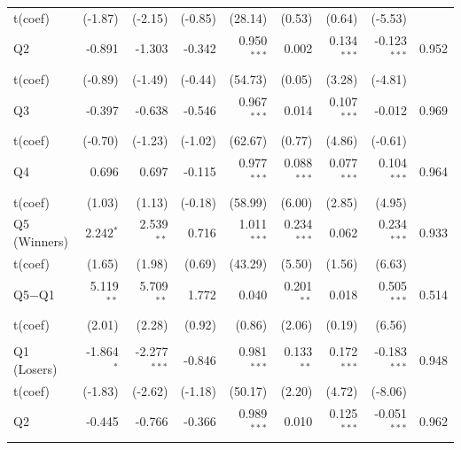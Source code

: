 {\begin{longtable}[t]{lrrrrrrrr}
\hspace{1em}t(coef) & (-1.87) & (-2.15) & (-0.85) & (28.14) & (0.53) & (0.64) & (-5.53) & \\
\hspace{1em}Q2 & -0.891 & -1.303 & -0.342 & 0.950$^{***}$ & 0.002 & 0.134$^{***}$ & -0.123$^{***}$ & 0.952\\
\hspace{1em}t(coef) & (-0.89) & (-1.49) & (-0.44) & (54.73) & (0.05) & (3.28) & (-4.81) & \\
\hspace{1em}Q3 & -0.397 & -0.638 & -0.546 & 0.967$^{***}$ & 0.014 & 0.107$^{***}$ & -0.012 & 0.969\\
\hspace{1em}t(coef) & (-0.70) & (-1.23) & (-1.02) & (62.67) & (0.77) & (4.86) & (-0.61) & \\
\hspace{1em}Q4 & 0.696 & 0.697 & -0.115 & 0.977$^{***}$ & 0.088$^{***}$ & 0.077$^{***}$ & 0.104$^{***}$ & 0.964\\
\hspace{1em}t(coef) & (1.03) & (1.13) & (-0.18) & (58.99) & (6.00) & (2.85) & (4.95) & \\
\hspace{1em}Q5 (Winners) & 2.242$^{*}$ & 2.539$^{**}$ & 0.716 & 1.011$^{***}$ & 0.234$^{***}$ & 0.062 & 0.234$^{***}$ & 0.933\\
\hspace{1em}t(coef) & (1.65) & (1.98) & (0.69) & (43.29) & (5.50) & (1.56) & (6.63) & \\
\hspace{1em}Q5$-$Q1 & 5.119$^{**}$ & 5.709$^{**}$ & 1.772 & 0.040 & 0.201$^{**}$ & 0.018 & 0.505$^{***}$ & 0.514\\
\hspace{1em}t(coef) & (2.01) & (2.28) & (0.92) & (0.86) & (2.06) & (0.19) & (6.56) & \\
\addlinespace[0.3em]
\hline
\multicolumn{9}{l}{Passive --- EW}\\
\hspace{1em}Q1 (Losers) & -1.864$^{*}$ & -2.277$^{***}$ & -0.846 & 0.981$^{***}$ & 0.133$^{**}$ & 0.172$^{***}$ & -0.183$^{***}$ & 0.948\\
\hspace{1em}t(coef) & (-1.83) & (-2.62) & (-1.18) & (50.17) & (2.20) & (4.72) & (-8.06) & \\
\hspace{1em}Q2 & -0.445 & -0.766 & -0.366 & 0.989$^{***}$ & 0.010 & 0.125$^{***}$ & -0.051$^{***}$ & 0.962\\

\end{longtable}}
